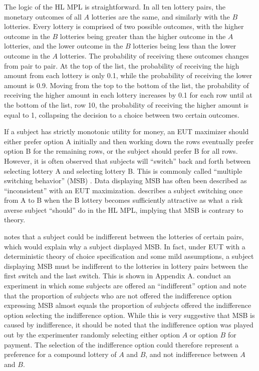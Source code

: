 \documentclass[../main.tex]{subfiles}
\begin{document}
The logic of the HL MPL is straightforward.
In all ten lottery pairs, the monetary outcomes of all $A$ lotteries are the same, and similarly with the $B$ lotteries.
Every lottery is comprised of two possible outcomes, with the higher outcome in the $B$ lotteries being greater than the higher outcome in the $A$ lotteries, and the lower outcome in the $B$ lotteries being less than the lower outcome in the $A$ lotteries.
The probability of receiving these outcomes changes from pair to pair.
At the top of the list, the probability of receiving the high amount from each lottery is only 0.1, while the probability of receiving the lower amount is 0.9.
Moving from the top to the bottom of the list, the probability of receiving the higher amount in each lottery increases by 0.1 for each row until at the bottom of the list, row 10, the probability of receiving the higher amount is equal to 1, collapsing the decision to a choice between two certain outcomes.


If a subject has strictly monotonic utility for money, an EUT maximizer should either prefer option A initially and then working down the rows eventually prefer option B for the remaining rows, or the subject should prefer B for all rows.
However, it is often observed that subjects will \enquote{switch} back and forth between selecting lottery A and selecting lottery B.
This is commonly called \enquote{multiple switching behavior} (MSB) \parencite{Bruner2011}.
Data displaying MSB has often been described as \enquote{inconsistent} with an EUT maximization.
\textcite[1645]{Holt2002} describes a subject switching once from A to B when the B lottery becomes sufficiently attractive as what a risk averse subject \enquote{should} do in the HL MPL, implying that MSB is contrary to theory.

\textcite[347]{Harrison2007} notes that a subject could be indifferent between the lotteries of certain pairs, which would explain why a subject displayed MSB.
In fact, under EUT with a deterministic theory of choice specification and some mild assumptions, a subject displaying MSB must be indifferent to the lotteries in lottery pairs between the first switch and the last switch.
This is shown in Appendix A.
\textcite{Harrison2007} conduct an experiment in which some subjects are offered an \enquote{indifferent} option and note that the proportion of subjects who are not offered the indifference option expressing MSB almost equals the proportion of subjects offered the indifference option  selecting the indifference option.
While this is very suggestive that MSB is caused by indifference, it should be noted that the indifference option was played out by the experimenter randomly selecting either option $A$ or option $B$ for payment.
The selection of the indifference option could therefore represent a preference for a compound lottery of $A$ and $B$, and not indifference between $A$ and $B$.
\end{document}
